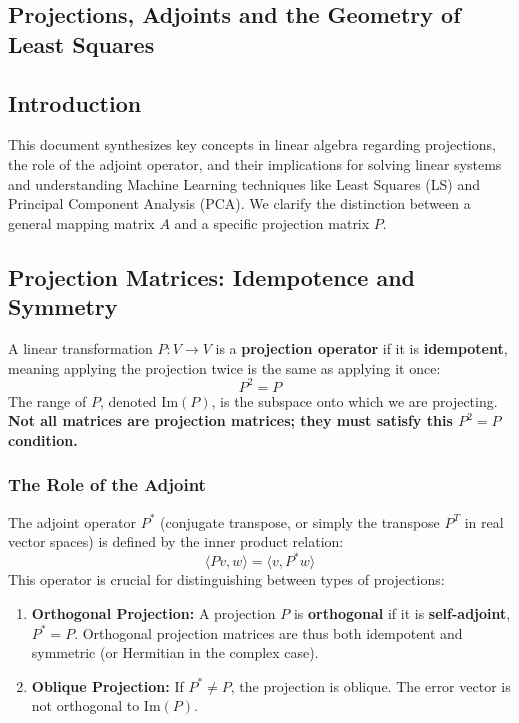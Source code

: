 \begin{notechapter}
\chapter{Projections, Adjoints and the Geometry of Least Squares}\label{ch:least-squares-geometry}

\section*{Introduction}
This document synthesizes key concepts in linear algebra regarding projections, the role of the adjoint operator, and their implications for solving linear systems and understanding Machine Learning techniques like Least Squares (LS) and Principal Component Analysis (PCA). We clarify the distinction between a general mapping matrix $A$ and a specific projection matrix $P$.

\section{Projection Matrices: Idempotence and Symmetry}

A linear transformation $P: V \to V$ is a \textbf{projection operator} if it is \textbf{idempotent}, meaning applying the projection twice is the same as applying it once:
$$P^2 = P$$
The range of $P$, denoted $\text{Im}(P)$, is the subspace onto which we are projecting. \textbf{Not all matrices are projection matrices; they must satisfy this $P^2=P$ condition.}

\subsection{The Role of the Adjoint}

The adjoint operator $P^*$ (conjugate transpose, or simply the transpose $P^T$ in real vector spaces) is defined by the inner product relation:
$$\langle Pv, w \rangle = \langle v, P^*w \rangle$$
This operator is crucial for distinguishing between types of projections:

\begin{enumerate}[label=(\roman*)]
    \item \textbf{Orthogonal Projection:} A projection $P$ is \textbf{orthogonal} if it is \textbf{self-adjoint}, $P^* = P$. Orthogonal projection matrices are thus both idempotent and symmetric (or Hermitian in the complex case).
    \item \textbf{Oblique Projection:} If $P^* \neq P$, the projection is oblique. The error vector is not orthogonal to $\text{Im}(P)$.
\end{enumerate}


\end{notechapter}
